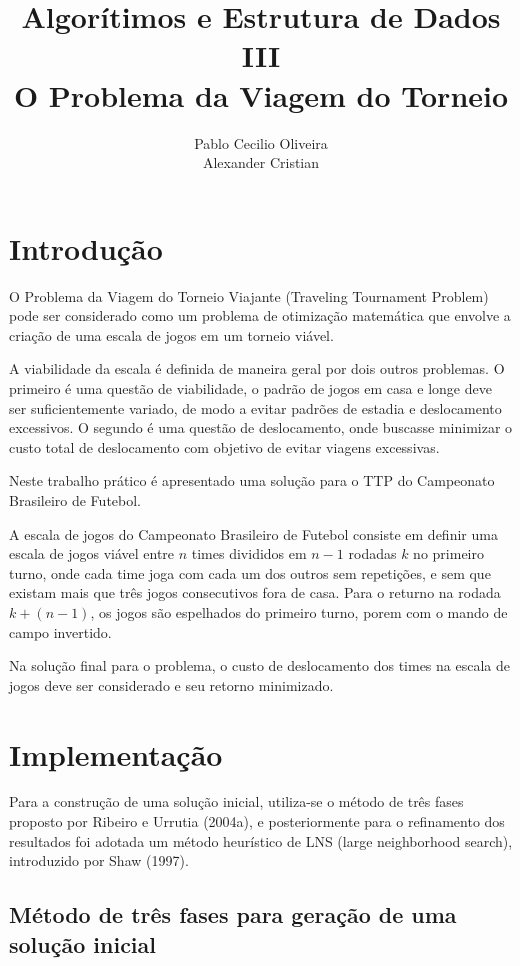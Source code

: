 \documentclass[12pt,a4paper]{article}
\author{Pablo Cecilio Oliveira\\
	Alexander Cristian}
\title{Algorítimos e Estrutura de Dados III\\
O Problema da Viagem do Torneio}
\date{}
\begin{document}
\maketitle

\section{Introdução}

O Problema da Viagem do Torneio Viajante (Traveling Tournament Problem) pode ser considerado como um problema de otimização matemática que envolve a criação de uma escala de jogos em um torneio viável.

A viabilidade da escala é definida de maneira geral por dois  outros problemas. O primeiro é uma questão de viabilidade, o padrão de jogos em casa e longe deve ser suficientemente variado, de modo a evitar padrões de estadia e deslocamento excessivos. O segundo é uma questão de deslocamento, onde buscasse minimizar o custo total de deslocamento com objetivo de evitar viagens excessivas.

Neste trabalho prático é apresentado uma solução para o TTP do Campeonato Brasileiro de Futebol.

A escala de jogos do Campeonato Brasileiro de Futebol consiste em definir uma escala de jogos viável entre $n$ times divididos em $n-1$ rodadas $k$ no primeiro turno, onde cada time joga com cada um dos outros sem repetições, e sem que existam mais que três jogos consecutivos fora de casa. Para o returno na rodada $k + (n - 1)$, os jogos são espelhados do primeiro turno, porem com o mando de campo invertido.

Na solução final para o problema, o custo de deslocamento dos times na escala de jogos deve ser considerado e seu retorno minimizado.

\section{Implementação}

Para a construção de uma solução inicial, utiliza-se o método de três fases proposto por Ribeiro e Urrutia (2004a)\cite{urrutia:heuristics}, e posteriormente para o refinamento dos resultados foi adotada um método heurístico de LNS (large neighborhood search), introduzido por Shaw (1997)\cite{tp:Shaw}.

\subsection{Método de três fases para geração de uma solução inicial}
\end{document}
